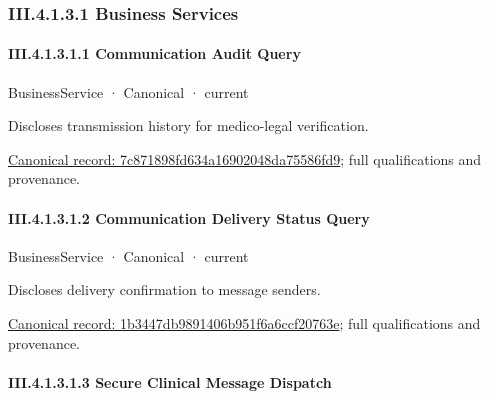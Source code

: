 \subsubsection*{III.4.1.3.1 Business Services}
\label{navigation:III.4.1.3.1}

\paragraph*{III.4.1.3.1.1 Communication Audit Query}
\label{navigation:III.4.1.3.1.1}

\label{element:7c871898fd634a16902048da75586fd9}
{\small BusinessService · Canonical · current}\par

Discloses transmission history for medico-legal verification.


{\footnotesize \href{../../../../continuum/business/business-service/7c871898fd634a16902048da75586fd9.md}{Canonical record: 7c871898fd634a16902048da75586fd9}; full qualifications and provenance.}\par
\paragraph*{III.4.1.3.1.2 Communication Delivery Status Query}
\label{navigation:III.4.1.3.1.2}

\label{element:1b3447db9891406b951f6a6ccf20763e}
{\small BusinessService · Canonical · current}\par

Discloses delivery confirmation to message senders.


{\footnotesize \href{../../../../continuum/business/business-service/1b3447db9891406b951f6a6ccf20763e.md}{Canonical record: 1b3447db9891406b951f6a6ccf20763e}; full qualifications and provenance.}\par
\paragraph*{III.4.1.3.1.3 Secure Clinical Message Dispatch}
\label{navigation:III.4.1.3.1.3}

